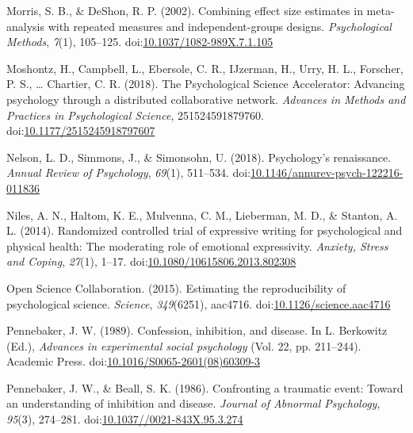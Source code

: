 \documentclass[,man]{apa6}
\begin{document}
\leavevmode\hypertarget{ref-Morris2002}{}%
Morris, S. B., \& DeShon, R. P. (2002). Combining effect size estimates in meta-analysis with repeated measures and independent-groups designs. \emph{Psychological Methods}, \emph{7}(1), 105--125. doi:\href{https://doi.org/10.1037/1082-989X.7.1.105}{10.1037/1082-989X.7.1.105}

\leavevmode\hypertarget{ref-Moshontz2018}{}%
Moshontz, H., Campbell, L., Ebersole, C. R., IJzerman, H., Urry, H. L., Forscher, P. S., \ldots{} Chartier, C. R. (2018). The Psychological Science Accelerator: Advancing psychology through a distributed collaborative network. \emph{Advances in Methods and Practices in Psychological Science}, 251524591879760. doi:\href{https://doi.org/10.1177/2515245918797607}{10.1177/2515245918797607}

\leavevmode\hypertarget{ref-Nelson2018}{}%
Nelson, L. D., Simmons, J., \& Simonsohn, U. (2018). Psychology's renaissance. \emph{Annual Review of Psychology}, \emph{69}(1), 511--534. doi:\href{https://doi.org/10.1146/annurev-psych-122216-011836}{10.1146/annurev-psych-122216-011836}

\leavevmode\hypertarget{ref-Niles2014}{}%
Niles, A. N., Haltom, K. E., Mulvenna, C. M., Lieberman, M. D., \& Stanton, A. L. (2014). Randomized controlled trial of expressive writing for psychological and physical health: The moderating role of emotional expressivity. \emph{Anxiety, Stress and Coping}, \emph{27}(1), 1--17. doi:\href{https://doi.org/10.1080/10615806.2013.802308}{10.1080/10615806.2013.802308}

\leavevmode\hypertarget{ref-OpenScienceCollaboration2015}{}%
Open Science Collaboration. (2015). Estimating the reproducibility of psychological science. \emph{Science}, \emph{349}(6251), aac4716. doi:\href{https://doi.org/10.1126/science.aac4716}{10.1126/science.aac4716}

\leavevmode\hypertarget{ref-Pennebaker1989}{}%
Pennebaker, J. W. (1989). Confession, inhibition, and disease. In L. Berkowitz (Ed.), \emph{Advances in experimental social psychology} (Vol. 22, pp. 211--244). Academic Press. doi:\href{https://doi.org/10.1016/S0065-2601(08)60309-3}{10.1016/S0065-2601(08)60309-3}

\leavevmode\hypertarget{ref-Pennebaker1986}{}%
Pennebaker, J. W., \& Beall, S. K. (1986). Confronting a traumatic event: Toward an understanding of inhibition and disease. \emph{Journal of Abnormal Psychology}, \emph{95}(3), 274--281. doi:\href{https://doi.org/10.1037//0021-843X.95.3.274}{10.1037//0021-843X.95.3.274}
\end{document}
